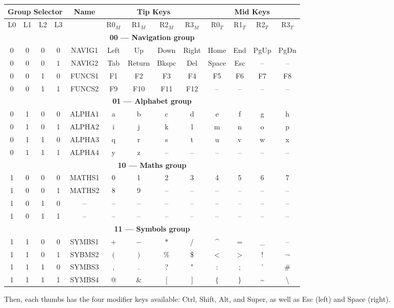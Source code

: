 \documentclass{article}
\begin{document}
\begin{center}
	\begin{tabular}{|cccc|c|cccc|cccc|}
		\hline
		\multicolumn{4}{|c|}{\textbf{Group Selector}} & \textbf{Name} & \multicolumn{4}{|c|}{\textbf{Tip Keys}} & \multicolumn{4}{|c|}{\textbf{Mid Keys}} \\ \hline
		L0 & L1 & L2 & L3 &  & R0$_M$ & R1$_M$ & R2$_M$ & R3$_M$ & R0$_T$ & R1$_T$ & R2$_T$ & R3$_T$ \\ \hline
		\multicolumn{13}{|c|}{\textbf{00 --- Navigation group}}\\ \hline
		0 & 0 & 0 & 0 & NAVIG1 & Left & Up & Down & Right & Home & End & PgUp & PgDn \\ \hline
		0 & 0 & 0 & 1 & NAVIG2 & Tab & Return & Bkspc & Del & Space & Esc & -- & -- \\ \hline
		0 & 0 & 1 & 0 & FUNCS1 & F1 & F2 & F3 & F4 & F5 & F6 & F7 & F8 \\ \hline
		0 & 0 & 1 & 1 & FUNCS2 & F9 & F10 & F11 & F12 & -- & -- & -- & -- \\ \hline
		\multicolumn{13}{|c|}{\textbf{01 --- Alphabet group}}\\ \hline
		0 & 1 & 0 & 0 & ALPHA1 & a & b & c & d & e & f & g & h \\ \hline
		0 & 1 & 0 & 1 & ALPHA2 & i & j & k & l & m & n & o & p \\ \hline
		0 & 1 & 1 & 0 & ALPHA3 & q & r & s & t & u & v & w & x \\ \hline
		0 & 1 & 1 & 1 & ALPHA4 & y & z & -- & -- & -- & -- & -- & -- \\ \hline
		\multicolumn{13}{|c|}{\textbf{10 --- Maths group}}\\ \hline
		1 & 0 & 0 & 0 & MATHS1 & 0 & 1 & 2 & 3 & 4 & 5 & 6 & 7 \\ \hline
		1 & 0 & 0 & 1 & MATHS2 & 8 & 9 & -- & -- & -- & -- & -- & -- \\ \hline
		1 & 0 & 1 & 0 & --     & -- & -- & -- & -- & -- & -- & -- & -- \\ \hline
		1 & 0 & 1 & 1 & --     & -- & -- & -- & -- & -- & -- & -- & -- \\ \hline
		\multicolumn{13}{|c|}{\textbf{11 --- Symbols group}}\\ \hline
		1 & 1 & 0 & 0 & SYMBS1 & $+$ & $-$ & $*$ & $/$ & \textasciicircum & $=$ & \_ & -- \\ \hline
		1 & 1 & 0 & 1 & SYBMS2 & $($ & $)$ & \% & \$ & $<$ & $>$ & ! & $\neg$ \\ \hline
		1 & 1 & 1 & 0 & SYMBS3 & , & . & ? & " & : & ; & ' & \# \\ \hline
		1 & 1 & 1 & 1 & SYMBS4 & @ & \& & $[$ & $]$ & $\{$ & $\}$ & \textasciitilde & \textbackslash \\ \hline
		
	\end{tabular}
\end{center}

Then, each thumbs has the four modifier keys available: Ctrl, Shift, Alt, and Super, as well as Esc (left) and Space (right).
\end{document}

